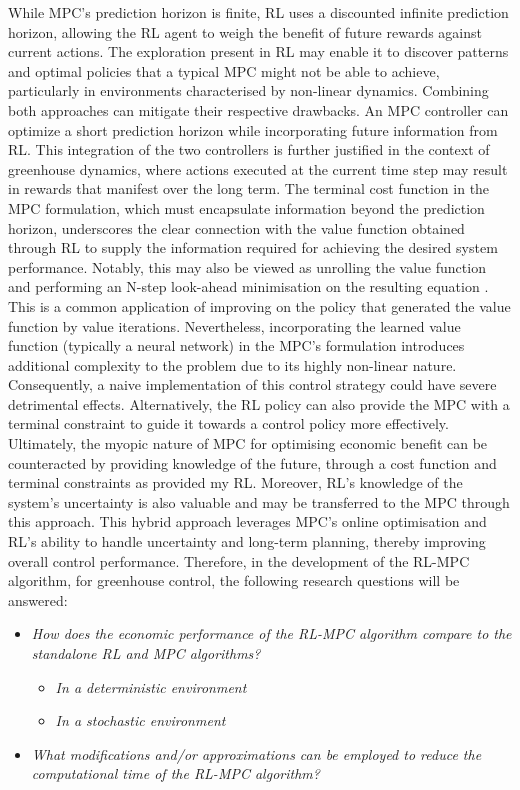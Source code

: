 While MPC's prediction horizon is finite, RL uses a discounted infinite prediction horizon, allowing the RL agent to weigh the benefit of future rewards against current actions. The exploration present in RL may enable it to discover patterns and optimal policies that a typical MPC might not be able to achieve, particularly in environments characterised by non-linear dynamics. Combining both approaches can mitigate their respective drawbacks. An MPC controller can optimize a short prediction horizon while incorporating future information from RL. This integration of the two controllers is further justified in the context of greenhouse dynamics, where actions executed at the current time step may result in rewards that manifest over the long term. The terminal cost function in the MPC formulation, which must encapsulate information beyond the prediction horizon, underscores the clear connection with the value function obtained through RL to supply the information required for achieving the desired system performance. Notably, this may also be viewed as unrolling the value function and performing an N-step look-ahead minimisation on the resulting equation \cite{bertsekasNewtonMethodReinforcement2022}. This is a common application of improving on the policy that generated the value function by value iterations. Nevertheless, incorporating the learned value function (typically a neural network) in the MPC's formulation introduces additional complexity to the problem due to its highly non-linear nature. Consequently, a naive implementation of this control strategy could have severe detrimental effects. Alternatively, the RL policy can also provide the MPC with a terminal constraint to guide it towards a control policy more effectively. Ultimately, the myopic nature of MPC for optimising economic benefit can be counteracted by providing knowledge of the future, through a cost function and terminal constraints as provided my RL. Moreover, RL's knowledge of the system's uncertainty is also valuable and may be transferred to the MPC through this approach. This hybrid approach leverages MPC's online optimisation and RL's ability to handle uncertainty and long-term planning, thereby improving overall control performance.  Therefore, in the development of the RL-MPC algorithm, for greenhouse control, the following research questions will be answered:


\begin{itemize}[itemsep=7pt] %
	\item \textit{How does the economic performance of the RL-MPC algorithm compare to the standalone RL and MPC algorithms?} \begin{itemize}
		\item \textit{In a deterministic environment}
		\item \textit{In a stochastic environment}
	\end{itemize}
	\item \textit{What modifications and/or approximations can be employed to reduce the computational time of the RL-MPC algorithm?}
\end{itemize}




